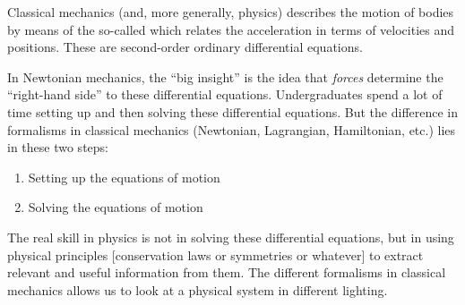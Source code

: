 

Classical mechanics (and, more generally, physics) describes the motion
of bodies by means of the so-called  which
relates the acceleration in terms of velocities and positions. These are
second-order ordinary differential equations.

In Newtonian mechanics, the ``big insight'' is the idea that
\emph{forces} determine the ``right-hand side'' to these differential
equations. Undergraduates spend a lot of time setting up and then
solving these differential equations. But the difference in formalisms
in classical mechanics (Newtonian, Lagrangian, Hamiltonian, etc.) lies
in these two steps:
\begin{enumerate}[label=(\alph*)]
\item Setting up the equations of motion
\item Solving the equations of motion
\end{enumerate}

\M
The real skill in physics is not in solving these differential
equations, but in using physical principles [conservation laws or
  symmetries or whatever] to extract relevant and
useful information from them.
The different formalisms in classical mechanics allows us to look at a
physical system in different lighting.

